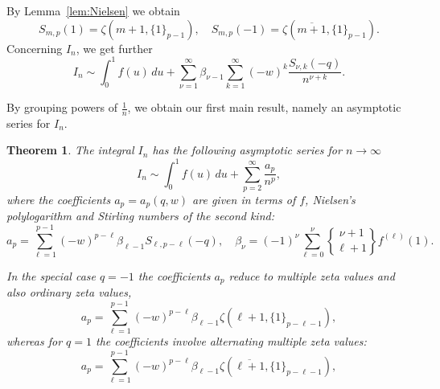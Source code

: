 \documentclass[10pt,reqno,a4paper]{amsart}%
\newtheorem{theorem}{Theorem}
\theoremstyle{definition}
\begin{document}




By Lemma~\ref{lem:Nielsen} we obtain
\begin{equation}
S_{m,p}(1)=\zeta(m+1,\{1\}_{p-1}),\quad S_{m,p}(-1)=\zeta(\overline
{m+1},\{1\}_{p-1}). \label{eqn:NielsenAMZV}%
\end{equation}
Concerning $I_{n}$, we get further
\[
I_{n}\sim\int_{0}^{1}f(u)\,du+\sum_{\nu=1}^{\infty}\beta_{\nu-1}\sum
_{k=1}^{\infty}(-w)^{k}\frac{S_{\nu,k}(-q)}{n^{\nu+k}}.
\]


By grouping powers of $\frac{1}{n}$, we obtain our first main result, namely
an asymptotic series for $I_{n}$.

\begin{theorem}
\label{the:main} The integral $I_{n}$ has the following asymptotic series for
$n\to\infty$
\[
I_{n} \sim\int_{0}^{1} f(u)\,du + \sum_{p=2}^{\infty} \frac{a_{p}}{n^{p}},
\]
where the coefficients $a_{p}=a_{p}(q,w)$ are given in terms of $f$, Nielsen's
polylogarithm and Stirling numbers of the second kind:
\[
a_{p}=\sum_{\ell=1}^{p-1} (-w)^{p-\ell}\beta_{\ell-1} 
S_{\ell,p-\ell}(-q), \quad\beta_{\nu}=(-1)^{\nu} \sum_{\ell=0}^{\nu}%
\genfrac{\{}{\}}{0pt}{}{\nu+1}{\ell+1}
f^{(\ell)}(1).
\]


In the special case $q=-1$ the coefficients $a_{p}$ reduce to multiple zeta
values and also ordinary zeta values,
\[
a_{p}=\sum_{\ell=1}^{p-1}(-w)^{p-\ell} \beta_{\ell-1} \zeta
(\ell+1,\{1\}_{p-\ell-1}),
\]
whereas for $q=1$ the coefficients involve alternating multiple zeta values:
\[
a_{p}=\sum_{\ell=1}^{p-1}(-w)^{p-\ell} \beta_{\ell-1} 
\zeta(\overline{\ell+1},\{1\}_{p-\ell-1}),
\]

\end{theorem}
\end{document}

